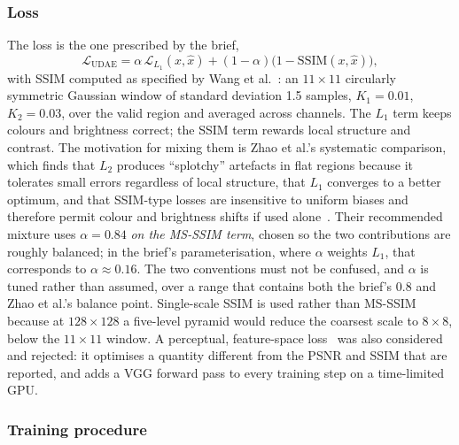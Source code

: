 \documentclass[conference]{IEEEtran}
\begin{document}
\subsubsection{Loss}

The loss is the one prescribed by the brief,
\begin{equation}
  \mathcal{L}_\text{UDAE} = \alpha\,\mathcal{L}_{L_1}(x,\hat{x}) + (1-\alpha)\bigl(1 - \mathrm{SSIM}(x,\hat{x})\bigr),
  \label{eq:udaeloss}
\end{equation}
with SSIM computed as specified by Wang et al.~\cite{wang2004image}: an
$11\times11$ circularly symmetric Gaussian window of standard deviation 1.5
samples, $K_1 = 0.01$, $K_2 = 0.03$, over the valid region and averaged across
channels. The $L_1$ term keeps colours and brightness correct; the SSIM term
rewards local structure and contrast. The motivation for mixing them is Zhao et
al.'s systematic comparison, which finds that $L_2$ produces ``splotchy''
artefacts in flat regions because it tolerates small errors regardless of local
structure, that $L_1$ converges to a better optimum, and that SSIM-type losses
are insensitive to uniform biases and therefore permit colour and brightness
shifts if used alone~\cite{zhao2017loss}. Their recommended mixture uses
$\alpha = 0.84$ \emph{on the MS-SSIM term}, chosen so the two contributions are
roughly balanced; in the brief's parameterisation, where $\alpha$ weights $L_1$,
that corresponds to $\alpha \approx 0.16$. The two conventions must not be
confused, and $\alpha$ is tuned rather than assumed, over a range that contains
both the brief's $0.8$ and Zhao et al.'s balance point. Single-scale SSIM is used
rather than MS-SSIM~\cite{wang2003multiscale} because at $128\times128$ a
five-level pyramid would reduce the coarsest scale to $8\times8$, below the
$11\times11$ window. A perceptual, feature-space
loss~\cite{johnson2016perceptual} was also considered and rejected: it optimises
a quantity different from the PSNR and SSIM that are reported, and adds a VGG
forward pass to every training step on a time-limited GPU.

\subsubsection{Training procedure}
\end{document}
